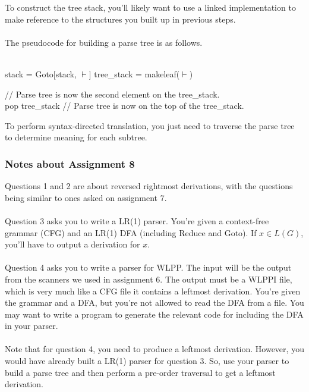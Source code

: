 \documentclass[]{article}
\theoremstyle{definition}
\begin{document}
			To construct the tree stack, you'll likely want to use a linked implementation to make reference to the structures you built up in previous steps.
			\\ \\
			The pseudocode for building a parse tree is as follows. \\ \\
			\begin{algorithm}[H]
				stack = Goto[stack, $\vdash$]\;
				tree\_stack = makeleaf($\vdash$)\;
				
				// Parse tree is now the second element on the tree\_stack. \\
				pop tree\_stack\;
				// Parse tree is now on the top of the tree\_stack.
			\end{algorithm}
			To perform syntax-directed translation, you just need to traverse the parse tree to determine meaning for each subtree.
			
			\subsubsection{Notes about Assignment 8}
				Questions 1 and 2 are about reversed rightmost derivations, with the questions being similar to ones asked on assignment 7.
				\\ \\
				Question 3 asks you to write a LR(1) parser. You're given a context-free grammar (CFG) and an LR(1) DFA (including Reduce and Goto). If $x \in L(G)$, you'll have to output a derivation for $x$.
				\\ \\
				Question 4 asks you to write a parser for WLPP. The input will be the output from the scanners we used in assignment 6. The output must be a WLPPI file, which is very much like a CFG file \textendash{} it contains a leftmost derivation. You're given the grammar and a DFA, but you're not allowed to read the DFA from a file. You may want to write a program to generate the relevant code for including the DFA in your parser.
				\\ \\
				Note that for question 4, you need to produce a leftmost derivation. However, you would have already built a LR(1) parser for question 3. So, use your parser to build a parse tree and then perform a pre-order traversal to get a leftmost derivation.
\end{document}
